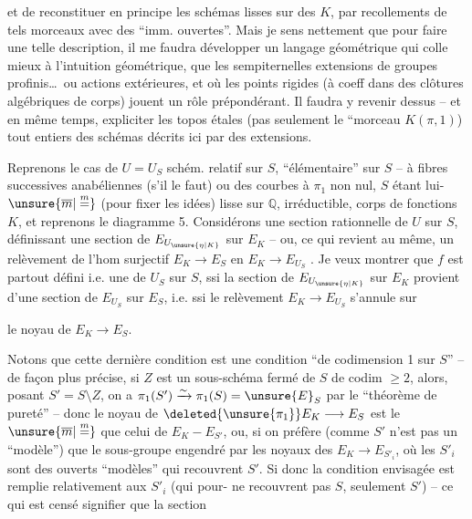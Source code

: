 et de reconstituer en principe les schémas lisses sur des $K$, par recollements de tels morceaux avec des ``imm. ouvertes''. Mais je sens nettement que pour faire une telle description, il me faudra développer un langage géométrique qui colle mieux à l'intuition géométrique, que les sempiternelles extensions de groupes profinis\ldots\ ou actions extérieures, et où les points rigides (à coeff dans des clôtures algébriques de corps) jouent un rôle prépondérant. Il  faudra y revenir dessus -- et en même temps, expliciter les topos étales (pas seulement le ``morceau $K(\pi,1)$) tout entiers des schémas décrits ici par des extensions.

Reprenons le cas de $U=U_S$ schém. relatif sur $S$, ``élémentaire'' sur $S$ -- à fibres successives anabéliennes (s'il le faut) ou des courbes à $\pi_1$ non nul, $S$ étant lui-$\unsure{\overline m|\overset{m}{=}}$ (pour fixer les idées) lisse sur $\mathbb{Q}$, irréductible, corps de fonctions $K$, et reprenons le diagramme 5. Considérons une section rationnelle  de $U$ sur $S$, définissant une section de $E_{U_{\unsure{\eta|K}}}$ sur $E_K$ -- ou, ce qui revient au même, un relèvement de l'hom surjectif $E_K\longrightarrow E_S$ en $E_K\longrightarrow E_{U_S}$ . Je veux montrer que $f$ est partout défini i.e. une   de $U_S$ sur $S$, ssi la section de $E_{U_{\unsure{\eta|K}}}$ sur $E_K$ provient d'une section de $E_{U_S}$ sur $E_S$, i.e. ssi le relèvement $E_K\longrightarrow E_{U_S}$ s'annule sur

le noyau de $E_K\longrightarrow E_S$.

Notons que cette dernière condition est une condition ``de codimension 1 sur $S$'' -- de façon plus précise, si $Z$ est un sous-schéma fermé de $S$ de codim $\geq 2$,  alors, posant $S'=S\setminus Z$, on a $\pi_1(S')\xrightarrow{\sim}\pi_1(S)=\unsure{E}_S$ par le ``théorème de pureté'' -- donc le noyau de $\deleted{\unsure{\pi_1}}E_K\longrightarrow E_S$ est le $\unsure{\overline m|\overset{m}{=}}$ que celui de $E_K-E_{S'}$, ou, si on préfère (comme $S'$ n'est pas un ``modèle'') que le sous-groupe  engendré par les noyaux des $E_K\longrightarrow E_{S'_i}$, où les $S'_i$ sont des ouverts ``modèles'' qui recouvrent $S'$. Si donc la condition envisagée est remplie relativement aux $S'_i$ (qui pour- ne recouvrent pas $S$, seulement $S'$) -- ce qui est censé signifier que la section

